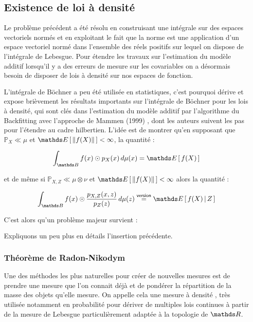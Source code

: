 \subsection{Existence de loi à densité}
{

    Le problème précédent a été résolu en construisant une intégrale sur des espaces vectoriels normés et en exploitant le fait que la norme est une application d'un espace vectoriel normé dans l'ensemble des réels positifs sur lequel on dispose de l'intégrale de Lebesgue. Pour étendre les travaux sur l'estimation du modèle additif lorsqu'il y a des erreurs de mesure sur les covariables on a désormais besoin de disposer de lois à densité sur nos espaces de fonction. 

    \bigskip
    
    L'intégrale de Böchner a peu été utilisée en statistiques, c'est pourquoi \cite{jeon2020additive} dérive et expose brièvement les résultats importants sur l'intégrale de Böchner pour les lois à densité, qui sont clés dans l'estimation du modèle additif par l'algorithme du Backfitting avec l'approche de Mammen (1999) \cite{mammen1999existence}, dont les auteurs suivent les pas pour l'étendre au cadre hilbertien. L'idée est de montrer qu'en supposant que $\mathds P_X \ll \mu$ et $\esperance{\lVert f(X) \rVert} < \infty$, la quantité :

    \begin{equation}
        \displaystyle\int_{\mathds B} f(x) \odot p_X(x) \, d\mu(x) = \esperance{f(X)}\label{eq:bochner_densite}
    \end{equation}

    et de même si $\mathds P_{X, Z} \ll \mu \otimes \nu$ et $\esperance{\lVert f(X) \rVert} < \infty$ alors la quantité :

    \begin{equation}
        \displaystyle\int_{\mathds B} f(x) \odot \frac{p_{X, Z}(x,z)}{p_Z(z)} \, d\mu(z) \overset{\textsf{version}}= \esperancesachant Z {f(X)}\label{eq:bochner_densite_cond}
    \end{equation}
    
    C'est alors qu'un problème majeur survient :


    Expliquons un peu plus en détails l'insertion précédente.
    \subsubsection{Théorème de Radon-Nikodym}
    {
        Une des méthodes les plus naturelles pour créer de nouvelles mesures est de prendre une mesure que l'on connait déjà et de pondérer la répartition de la masse des objets qu'elle mesure. On appelle cela une mesure à \og densité \fg, très utilisée notamment en probabilité pour dériver de multiples \og lois continues \fg à partir de la mesure de Lebesgue particulièrement adaptée à la topologie de $\grandR$.

}}
